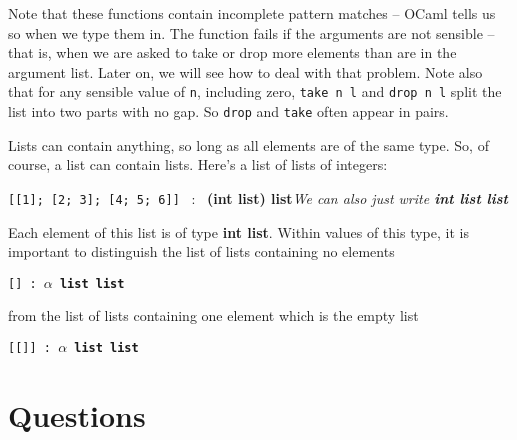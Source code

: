 \documentclass[]{book}
\newcommand{\smspace}{\vspace{4mm}}
\begin{document}
\noindent Note that these functions contain incomplete pattern matches -- OCaml tells us so when we type them in. The function fails if the arguments are not sensible -- that is, when we are asked to take or drop more elements than are in the argument list. Later on, we will see how to deal with that problem. Note also that for any sensible value of \texttt{n}, including zero, \texttt{take\! n\! l} and \texttt{drop\! n\! l} split the list into two parts with no gap. So \texttt{drop} and \texttt{take} often appear in pairs.

Lists can contain anything, so long as all elements are of the same type. So, of course, a list can contain lists. Here's a list of lists of integers:

\smspace
\texttt{[[1]; [2; 3]; [4; 5; 6]]} \ : \ \textsf{\textbf{\textmd{(}int list\textmd{)} list}}\hfill\textit{We can also just write \textbf{\textsf{int list list}}} 
\smspace

\noindent Each element of this list is of type \textsf{\textbf{int list}}. Within values of this type, it is important to distinguish the list of lists containing no elements

\smspace
\texttt{[] :\ \textsf{\textbf{$\alpha$ list list}}}
\smspace

\noindent from the list of lists containing one element which is the empty list

\smspace
\texttt{[[]] :\ \textsf{\textbf{$\alpha$ list list}}}
\smspace


\clearpage
\section*{Questions}
\end{document}
